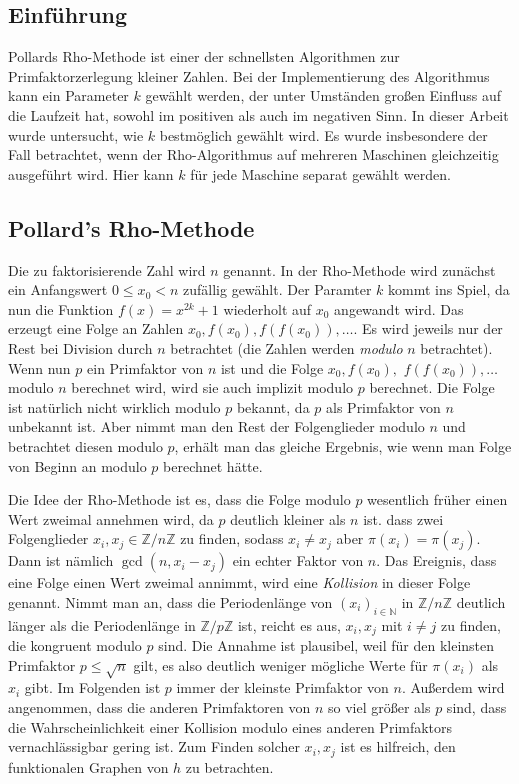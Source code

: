 \documentclass[a4paper, extrafontsizes, ngerman, 25pt]{memoir}
\newcommand{\Z}{\mathbb{Z}}
\newcommand{\N}{\mathbb{N}}
\begin{document}
\subsection{Einführung}

Pollards Rho-Methode ist einer der schnellsten Algorithmen zur Primfaktorzerlegung kleiner Zahlen. Bei der Implementierung des Algorithmus kann ein Parameter $k$ gewählt werden, der unter Umständen großen Einfluss auf die Laufzeit hat, sowohl im positiven als auch im negativen Sinn. In dieser Arbeit wurde untersucht, wie $k$ bestmöglich gewählt wird. Es wurde insbesondere der Fall betrachtet, wenn der Rho-Algorithmus auf mehreren Maschinen gleichzeitig ausgeführt wird. Hier kann $k$ für jede Maschine separat gewählt werden.

\newpage

\subsection{Pollard's Rho-Methode}

Die zu faktorisierende Zahl wird $n$ genannt. In der Rho-Methode wird zunächst ein Anfangswert $0 \le x_0 < n$ zufällig gewählt. Der Paramter $k$ kommt ins Spiel, da nun die Funktion $f(x) = x^{2k} + 1$ wiederholt auf $x_0$ angewandt wird. Das erzeugt eine Folge an Zahlen $x_0, f(x_0), f(f(x_0)), \dots$. Es wird jeweils nur der Rest bei Division durch $n$ betrachtet (die Zahlen werden \emph{modulo} $n$ betrachtet). Wenn nun $p$ ein Primfaktor von $n$ ist und die Folge $x_0, f(x_0),$ $f(f(x_0)), \dots$ modulo $n$ berechnet wird, wird sie auch implizit modulo $p$ berechnet. Die Folge ist natürlich nicht wirklich modulo $p$ bekannt, da $p$ als Primfaktor von $n$ unbekannt ist. Aber nimmt man den Rest der Folgenglieder modulo $n$ und betrachtet diesen modulo $p$, erhält man das gleiche Ergebnis, wie wenn man Folge von Beginn an modulo $p$ berechnet hätte.

Die Idee der Rho-Methode ist es, dass die Folge modulo $p$ wesentlich früher einen Wert zweimal annehmen wird, da $p$ deutlich kleiner als $n$ ist. dass  zwei Folgenglieder $x_i, x_j \in \Z/n\Z$ zu finden, sodass $x_i \ne x_j$ aber $\pi(x_i) = \pi(x_j)$. Dann ist nämlich $\gcd(n, x_i - x_j)$ ein echter Faktor von $n$. Das Ereignis, dass eine Folge einen Wert zweimal annimmt, wird eine \emph{Kollision} in dieser Folge genannt. Nimmt man an, dass die Periodenlänge von $(x_i)_{i \in \N}$ in $\Z/n\Z$ deutlich länger als die Periodenlänge in $\Z/p\Z$ ist, reicht es aus, $x_i, x_j$ mit $i \ne j$ zu finden, die kongruent modulo $p$ sind. Die Annahme ist plausibel, weil für den kleinsten Primfaktor $p \le \sqrt n$ gilt, es also deutlich weniger mögliche Werte für $\pi(x_i)$ als $x_i$ gibt. Im Folgenden ist $p$ immer der kleinste Primfaktor von $n$. Außerdem wird angenommen, dass die anderen Primfaktoren von $n$ so viel größer als $p$ sind, dass die Wahrscheinlichkeit einer Kollision modulo eines anderen Primfaktors vernachlässigbar gering ist. Zum Finden solcher $x_i, x_j$ ist es hilfreich, den funktionalen Graphen von $h$ zu betrachten.
\end{document}
